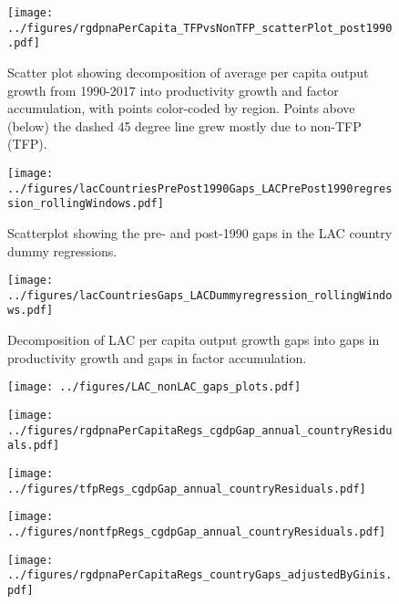 \documentclass[12pt,english]{article}
\theoremstyle{remark}
\begin{document}
\begin{sidewaysfigure}
	\centering
	\texttt{[image: ../figures/rgdpnaPerCapita\_TFPvsNonTFP\_scatterPlot\_post1990.pdf]}
	\caption{Scatter plot showing decomposition of average per capita output growth from 1990-2017 into productivity growth and factor accumulation, with points color-coded by region. Points above (below) the dashed 45 degree line grew mostly due to non-TFP (TFP).}
\end{sidewaysfigure}

\begin{sidewaysfigure}
	\centering
	\texttt{[image: ../figures/lacCountriesPrePost1990Gaps\_LACPrePost1990regression\_rollingWindows.pdf]}
	\caption{Scatterplot showing the pre- and post-1990 gaps in the LAC country dummy regressions.}
\end{sidewaysfigure}

\begin{sidewaysfigure}
	\centering
	\texttt{[image: ../figures/lacCountriesGaps\_LACDummyregression\_rollingWindows.pdf]}
	\caption{Decomposition of LAC per capita output growth gaps into gaps in productivity growth and gaps in factor accumulation.}
\end{sidewaysfigure}


\begin{sidewaysfigure}
	\centering
	\texttt{[image: ../figures/LAC\_nonLAC\_gaps\_plots.pdf]}
	\caption{}
\end{sidewaysfigure}

\begin{sidewaysfigure}
	\centering
	\texttt{[image: ../figures/rgdpnaPerCapitaRegs\_cgdpGap\_annual\_countryResiduals.pdf]}
	\caption{}
\end{sidewaysfigure}

\begin{sidewaysfigure}
	\centering
	\texttt{[image: ../figures/tfpRegs\_cgdpGap\_annual\_countryResiduals.pdf]}
	\caption{}
\end{sidewaysfigure}

\begin{sidewaysfigure}
	\centering
	\texttt{[image: ../figures/nontfpRegs\_cgdpGap\_annual\_countryResiduals.pdf]}
	\caption{}
\end{sidewaysfigure}




\begin{sidewaysfigure}
	\centering
	\texttt{[image: ../figures/rgdpnaPerCapitaRegs\_countryGaps\_adjustedByGinis.pdf]}
	\caption{} 
\end{sidewaysfigure}
\end{document}
